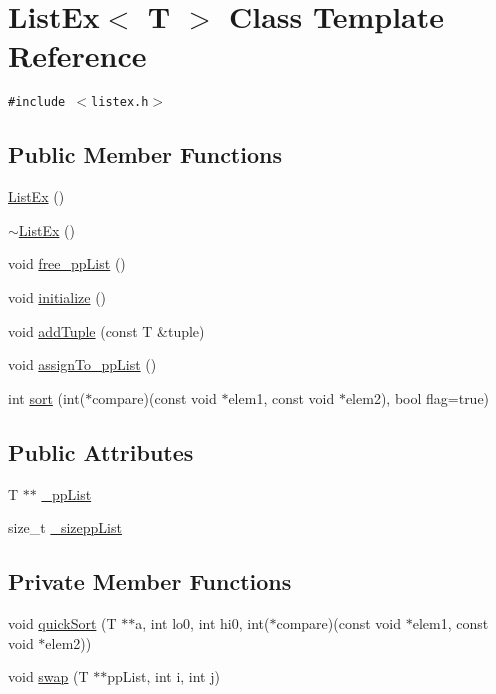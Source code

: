 \hypertarget{classListEx}{
\section{ListEx$<$ T $>$ Class Template Reference}
\label{classListEx}
}
{\tt \#include $<$listex.h$>$}

\subsection*{Public Member Functions}
\begin{CompactItemize}
\item 
\hyperlink{classListEx_e4072096112038fb9c1c764765e33183}{ListEx} ()
\item 
\hyperlink{classListEx_2ad75ad4eb5e4c3fcc8ea98bcbd2fc5e}{$\sim$ListEx} ()
\item 
void \hyperlink{classListEx_33891b15cb9a612d4e49434889441160}{free\_\-ppList} ()
\item 
void \hyperlink{classListEx_261a36557da2280b02fcb79eea3525fd}{initialize} ()
\item 
void \hyperlink{classListEx_14006a0f7481d9849d1c77950e8a0b2a}{addTuple} (const T \&tuple)
\item 
void \hyperlink{classListEx_b93fee1e8bf433bc66b6522227babdc5}{assignTo\_\-ppList} ()
\item 
int \hyperlink{classListEx_7db48fe6316ab19995190763195bbf65}{sort} (int($\ast$compare)(const void $\ast$elem1, const void $\ast$elem2), bool flag=true)
\end{CompactItemize}
\subsection*{Public Attributes}
\begin{CompactItemize}
\item 
T $\ast$$\ast$ \hyperlink{classListEx_1d03da1d1e0dc2d5fb097c31fa14456e}{\_\-ppList}
\item 
size\_\-t \hyperlink{classListEx_933351b4aa581888325912316a905738}{\_\-sizeppList}
\end{CompactItemize}
\subsection*{Private Member Functions}
\begin{CompactItemize}
\item 
void \hyperlink{classListEx_7d33869802cb48bae239d18a11472e4a}{quickSort} (T $\ast$$\ast$a, int lo0, int hi0, int($\ast$compare)(const void $\ast$elem1, const void $\ast$elem2))
\item 
void \hyperlink{classListEx_df32b41c634a42c27aef6b832bedb853}{swap} (T $\ast$$\ast$ppList, int i, int j)
\end{CompactItemize}


